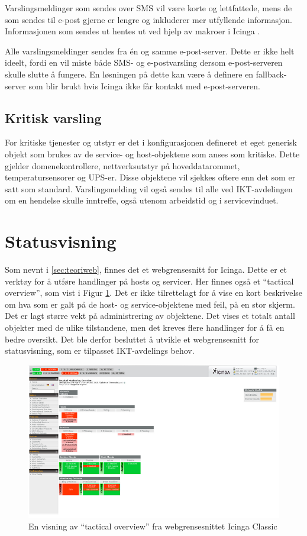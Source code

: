 Varslingsmeldinger som sendes over SMS vil være korte og lettfattede, mens de som sendes til e-post gjerne er lengre og inkluderer mer utfyllende informasjon. Informasjonen som sendes ut hentes ut ved hjelp av makroer i Icinga \cite{icingamacro}. 

Alle varslingsmeldinger sendes fra én og samme e-post-server. Dette er ikke helt ideelt, fordi en vil miste både SMS- og e-postvarsling dersom e-post-serveren skulle slutte å fungere. En løsningen på dette kan være å definere en fallback-server som blir brukt hvis Icinga ikke får kontakt med e-post-serveren. 

\subsection{Kritisk varsling}
For kritiske tjenester og utstyr er det i konfigurasjonen defineret et eget generisk objekt som brukes av de service- og host-objektene som anses som kritiske. Dette gjelder domenekontrollere, nettverksutstyr på hoveddatarommet, temperatursensorer og UPS-er. Disse objektene vil sjekkes oftere enn det som er satt som standard. Varslingsmelding vil også sendes til alle ved IKT-avdelingen om en hendelse skulle inntreffe, også utenom arbeidstid og i servicevinduet.

\section{Statusvisning}
Som nevnt i \ref{sec:teoriweb}, finnes det et webgrensesnitt for Icinga. Dette er et verktøy for å utføre handlinger på hosts og servicer. Her finnes også et ``tactical overview'', som vist i Figur \ref{icingawebgui}. Det er ikke tilrettelagt for å vise en kort beskrivelse om hva som er galt på de host- og service-objektene med feil, på en stor skjerm. Det er lagt større vekt på administrering av objektene. Det vises et totalt antall objekter med de ulike tilstandene, men det kreves flere handlinger for å få en bedre oversikt. Det ble derfor besluttet å utvikle et webgrensesnitt for statusvisning, som er tilpasset IKT-avdelings behov.

\begin{figure}[H]
    \centering
    \includegraphics[scale=0.6]{img/icinga_tactical}
    \caption{En visning av ``tactical overview'' fra webgrensesnittet Icinga Classic}
    \label{icingawebgui}
\end{figure}

